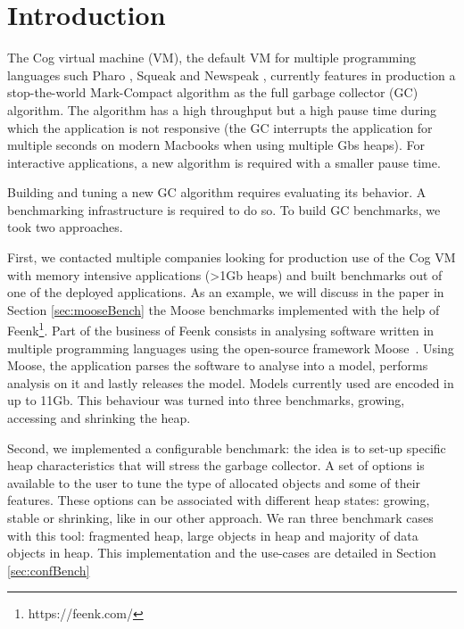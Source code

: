 \documentclass[10pt, sigplan]{acmart}
\begin{document}

\maketitle

\section{Introduction} \label{sec:intro}

The Cog virtual machine (VM), the default VM for multiple programming languages such Pharo \cite{PharoByExample}, Squeak \cite{SqueakByExample} and Newspeak \cite{NewspeakOopsla}, currently features in production a stop-the-world Mark-Compact algorithm as the full garbage collector (GC) algorithm. The algorithm has a high throughput but a high pause time during which the application is not responsive (the GC interrupts the application for multiple seconds on modern Macbooks when using multiple Gbs heaps). For interactive applications, a new algorithm is required with a smaller pause time.

Building and tuning a new GC algorithm requires evaluating its behavior. A benchmarking infrastructure is required to do so. To build GC benchmarks, we took two approaches. 

First, we contacted multiple companies looking for production use of the Cog VM with memory intensive applications (>1Gb heaps) and built benchmarks out of one of the deployed applications. As an example, we will discuss in the paper in Section \ref{sec:mooseBench} the Moose benchmarks implemented with the help of Feenk\footnote{https://feenk.com/}. Part of the business of Feenk consists in analysing software written in multiple programming languages using the open-source framework Moose~\cite{MoosePaper1,MooseBook1}. Using Moose, the application parses the software to analyse into a model, performs analysis on it and lastly releases the model. Models currently used are encoded in up to 11Gb. This behaviour was turned into three benchmarks, growing, accessing and shrinking the heap. 

Second, we implemented a configurable benchmark: the idea is to set-up specific heap characteristics that will stress the garbage collector. A set of options is available to the user to tune the type of allocated objects and some of their features. These options can be associated with different heap states: growing, stable or shrinking, like in our other approach. We ran three benchmark cases with this tool: fragmented heap, large objects in heap and majority of data objects in heap.
This implementation and the use-cases are detailed in Section \ref{sec:confBench}
\end{document}
